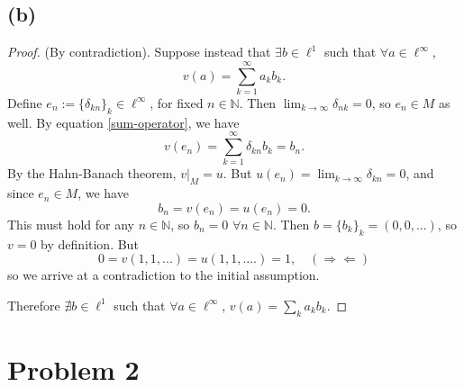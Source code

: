 \documentclass{article}
\begin{document}
\subsection*{(b)}
\begin{proof}
	(By contradiction). Suppose instead that $\exists b \in \ell^1$ such that $\forall a \in \ell^{\infty}$,
	\begin{equation}\label{sum-operator}
		v(a) = \sum_{k=1}^{\infty}a_k b_k.
	\end{equation}
	Define $e_n := \{\delta_{kn}\}_k \in \ell^{\infty}$, for fixed $n\in\mathbb{N}$. Then $\lim_{k \to \infty}\delta_{nk} = 0$, so $e_n \in M$ as well. By equation \eqref{sum-operator}, we have
	\begin{equation}
		v(e_n) = \sum_{k=1}^{\infty}\delta_{kn}b_k = b_n.
	\end{equation}
	By the Hahn-Banach theorem, $v|_{M} = u$. But $u(e_n) = \lim_{k \to \infty}\delta_{kn}=0$, and since $e_n \in M$, we have
	\begin{equation}
		b_n = v(e_n)=u(e_n) = 0.
	\end{equation}
	This must hold for any $n\in\mathbb{N}$, so $b_n=0$ $\forall n\in\mathbb{N}$. Then $b=\{b_k\}_k = (0, 0, ...)$, so $v=0$ by definition. But
	\begin{equation}
		0 = v(1, 1, ...) = u(1, 1, ....) = 1, \quad (\Rightarrow \Leftarrow)
	\end{equation}
	so we arrive at a contradiction to the initial assumption. 
	
	Therefore $\nexists b \in \ell^1$ such that $\forall a \in \ell^{\infty}$, $v(a)=\sum_k a_k b_k$.
\end{proof}
\section*{Problem 2}
\end{document}

